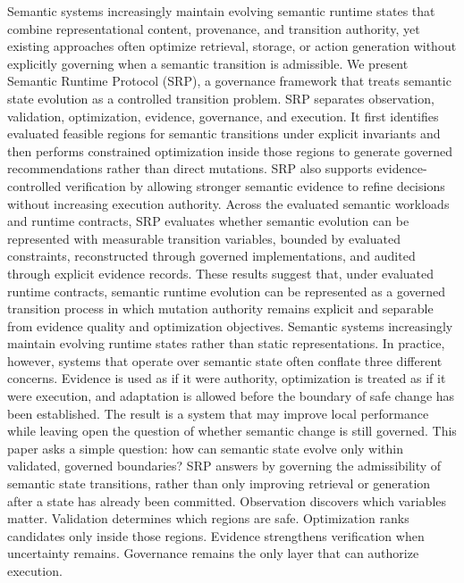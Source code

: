 \markdownRendererDocumentBegin
\markdownRendererSectionBegin
{}\markdownRendererInterblockSeparator
{}\markdownRendererSectionBegin
{}\markdownRendererInterblockSeparator
{}Semantic systems increasingly maintain evolving semantic runtime states that combine representational content, provenance, and transition authority, yet existing approaches often optimize retrieval, storage, or action generation without explicitly governing when a semantic transition is admissible. We present Semantic Runtime Protocol (SRP), a governance framework that treats semantic state evolution as a controlled transition problem. SRP separates observation, validation, optimization, evidence, governance, and execution. It first identifies evaluated feasible regions for semantic transitions under explicit invariants and then performs constrained optimization inside those regions to generate governed recommendations rather than direct mutations. SRP also supports evidence-controlled verification by allowing stronger semantic evidence to refine decisions without increasing execution authority. Across the evaluated semantic workloads and runtime contracts, SRP evaluates whether semantic evolution can be represented with measurable transition variables, bounded by evaluated constraints, reconstructed through governed implementations, and audited through explicit evidence records. These results suggest that, under evaluated runtime contracts, semantic runtime evolution can be represented as a governed transition process in which mutation authority remains explicit and separable from evidence quality and optimization objectives.\markdownRendererInterblockSeparator
{}
\markdownRendererSectionEnd \markdownRendererSectionBegin
{}\markdownRendererInterblockSeparator
{}Semantic systems increasingly maintain evolving runtime states rather than static representations. In practice, however, systems that operate over semantic state often conflate three different concerns. Evidence is used as if it were authority, optimization is treated as if it were execution, and adaptation is allowed before the boundary of safe change has been established. The result is a system that may improve local performance while leaving open the question of whether semantic change is still governed.\markdownRendererParagraphSeparator
{}This paper asks a simple question: how can semantic state evolve only within validated, governed boundaries? SRP answers by governing the admissibility of semantic state transitions, rather than only improving retrieval or generation after a state has already been committed. Observation discovers which variables matter. Validation determines which regions are safe. Optimization ranks candidates only inside those regions. Evidence strengthens verification when uncertainty remains. Governance remains the only layer that can authorize execution.\markdownRendererParagraphSeparator
